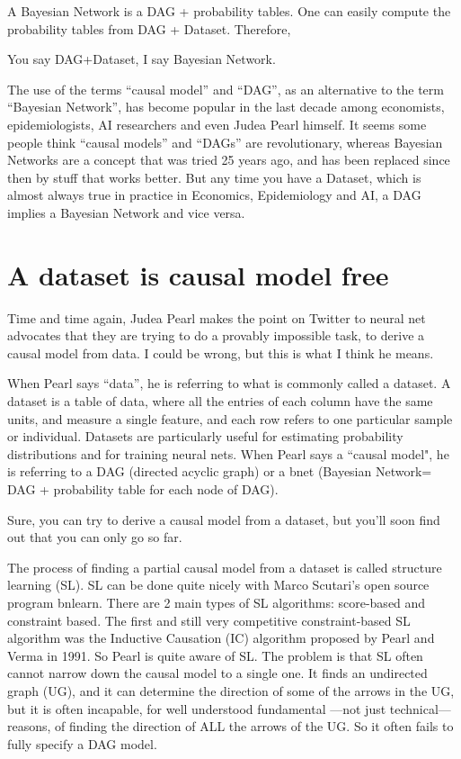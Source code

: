  A Bayesian Network is a DAG + probability tables. One can easily compute the
 probability tables from DAG + Dataset. Therefore,

You say DAG+Dataset, I say Bayesian Network.

The use of the terms ``causal model” and ``DAG”, as an alternative to the term
``Bayesian Network”, has become popular in the last decade
among economists, epidemiologists,
AI researchers and even Judea Pearl himself. It seems some
people think ``causal models” and ``DAGs” are revolutionary, whereas Bayesian
Networks are a concept that was tried 25 years ago, and has been replaced
since then by stuff that works better. But any time you have a Dataset, which
is almost always true in practice in Economics,
Epidemiology  and AI, a DAG implies a
Bayesian Network and vice versa.



\section{A dataset is causal model free}
Time and time again, Judea Pearl makes the point on Twitter to neural net
advocates that they are trying to do a provably impossible task,
 to derive a
causal model from data. I could be wrong, but this is what I think he means.

When Pearl says ``data”, he is referring to what is commonly called a dataset.
A dataset is a table of data, where all the entries of each column have the
same units, and measure a single feature, and each row refers to one
particular sample or individual. Datasets are particularly useful for
estimating probability distributions and for training neural nets. When Pearl
says a ``causal model", he is referring to a DAG (directed acyclic graph) or a
bnet
(Bayesian Network= DAG + probability table for each node of DAG).

Sure, you can try to derive a causal model from a dataset,
 but you’ll soon find
 out
that you can only go so far.

The process of finding a partial causal model from a dataset is called
structure
learning (SL).  SL can be done quite nicely with Marco Scutari’s open source
program bnlearn. There are 2 main types of SL algorithms: score-based and
constraint based. The first and still very competitive constraint-based SL
algorithm was the Inductive Causation (IC) algorithm proposed by Pearl and
Verma in 1991. So Pearl is quite aware of SL. The problem is that SL often
cannot narrow down the causal model to a single one.
It finds an undirected
graph
(UG), and it can determine the direction of some of the arrows in the UG, but
it is often incapable, for well understood fundamental
---not just technical---
reasons, of finding the direction of ALL the arrows of the UG. So it often
fails to fully specify a DAG model.


